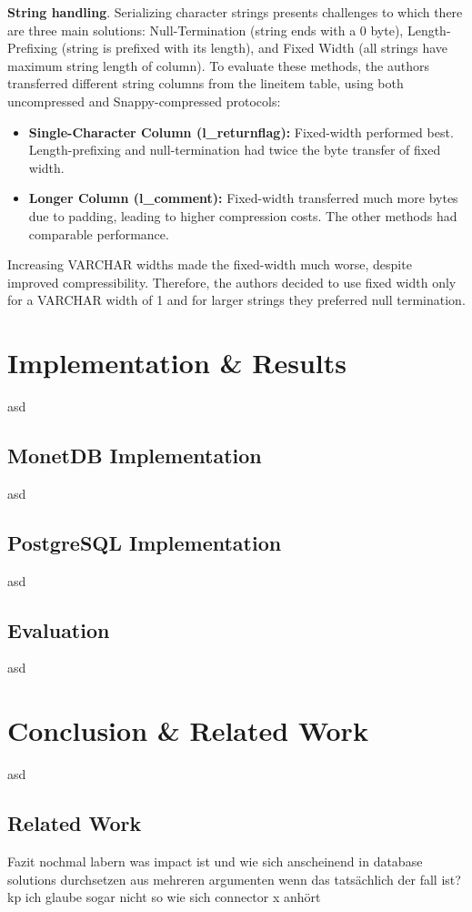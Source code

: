 \documentclass[sigconf]{acmart}
\begin{document}
\textbf{String handling}.
Serializing character strings presents challenges to which there are three main solutions: Null-Termination (string ends with a 0 byte), Length-Prefixing (string is prefixed with its length), and Fixed Width (all strings have maximum string length of column). To evaluate these methods, the authors transferred different string columns from the lineitem table, using both uncompressed and Snappy-compressed protocols:
\begin{itemize}
    \item \textbf{Single-Character Column (l\_returnflag):} Fixed-width performed best. Length-prefixing and null-termination had twice the byte transfer of fixed width.
    \item \textbf{Longer Column (l\_comment):} Fixed-width transferred much more bytes due to padding, leading to higher compression costs. The other methods had comparable performance.
\end{itemize}

Increasing VARCHAR widths made the fixed-width much worse, despite improved compressibility. Therefore, the authors decided to use fixed width only for a VARCHAR width of 1 and for larger strings they preferred null termination.


\section{Implementation \& Results}
asd
\subsection{MonetDB Implementation}
asd
\subsection{PostgreSQL Implementation}
asd
\subsection{Evaluation}
asd
\section{Conclusion \& Related Work}
asd
\subsection{Related Work}
Fazit nochmal labern was impact ist und wie sich anscheinend in database solutions durchsetzen aus mehreren argumenten wenn das tatsächlich der fall ist? kp
ich glaube sogar nicht so wie sich connector x anhört




\end{document}
